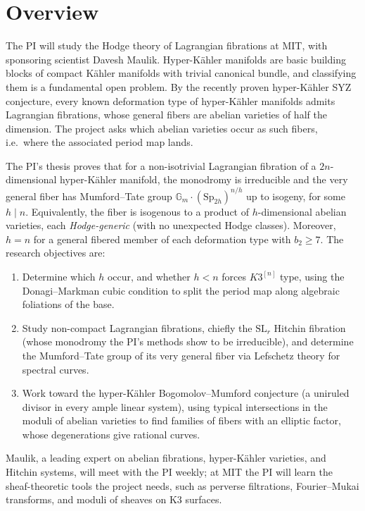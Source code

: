\documentclass[11pt]{article}
\newcommand{\Gm}{\mathbb{G}_m}
\newcommand{\Sp}{\mathrm{Sp}}
\newcommand{\SL}{\mathrm{SL}}
\begin{document}
\section*{Overview}

The PI will study the Hodge theory of Lagrangian fibrations at MIT, with sponsoring
scientist Davesh Maulik. Hyper-K\"ahler manifolds are basic building blocks of compact
K\"ahler manifolds with trivial canonical bundle, and classifying them is a fundamental open
problem. By the recently proven hyper-K\"ahler SYZ conjecture, every known deformation type
of hyper-K\"ahler manifolds admits Lagrangian fibrations, whose general fibers are 
abelian varieties of half the dimension. The project asks which abelian varieties 
occur as such fibers, i.e.\ where the associated period map lands.

The PI's thesis proves that for a non-isotrivial Lagrangian fibration of a $2n$-dimensional
hyper-K\"ahler manifold, the monodromy is irreducible and the very general fiber has
Mumford--Tate group $\Gm\cdot(\Sp_{2h})^{n/h}$ up to isogeny, for some $h\mid n$. 
Equivalently, the fiber is isogenous to a product of $h$-dimensional abelian varieties, 
each \emph{Hodge-generic} (with no unexpected Hodge classes). Moreover, $h=n$ for a 
general fibered member of each deformation type with $b_2\ge7$. 
The research objectives are:
\begin{enumerate}[label=\textbf{RO \arabic*.}]
  \item Determine which $h$ occur, and whether $h<n$ forces $K3^{[n]}$ type, using the
  Donagi--Markman cubic condition to split the period map along algebraic foliations of the
  base.
  \item Study non-compact Lagrangian fibrations, chiefly the $\SL_r$ Hitchin fibration (whose
  monodromy the PI's methods show to be irreducible), and determine the Mumford--Tate group
  of its very general fiber via Lefschetz theory for spectral curves.
  \item Work toward the hyper-K\"ahler Bogomolov--Mumford conjecture (a uniruled divisor in
  every ample linear system), using typical intersections in the moduli of abelian varieties
  to find families of fibers with an elliptic factor, whose degenerations give rational
  curves.
\end{enumerate}

Maulik, a leading expert on abelian fibrations, hyper-K\"ahler varieties, and Hitchin
systems, will meet with the PI weekly; at MIT the PI will learn the sheaf-theoretic tools
the project needs, such as perverse filtrations, Fourier--Mukai transforms, and moduli of
sheaves on K3 surfaces.
\end{document}
